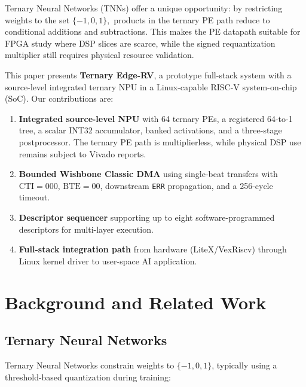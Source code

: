 \documentclass[10pt,conference]{IEEEtran}
\begin{document}
Ternary Neural Networks (TNNs) \cite{ternarynet} offer a unique opportunity: by restricting weights to the set $\{-1, 0, 1\},$ products in the ternary PE path reduce to conditional additions and subtractions. This makes the PE datapath suitable for FPGA study where DSP slices are scarce, while the signed requantization multiplier still requires physical resource validation.

This paper presents \textbf{Ternary Edge-RV}, a prototype full-stack system with a source-level integrated ternary NPU in a Linux-capable RISC-V system-on-chip (SoC). Our contributions are:

\begin{enumerate}
    \item \textbf{Integrated source-level NPU} with 64 ternary PEs, a registered 64-to-1 tree, a scalar INT32 accumulator, banked activations, and a three-stage postprocessor. The ternary PE path is multiplierless, while physical DSP use remains subject to Vivado reports.
    \item \textbf{Bounded Wishbone Classic DMA} using single-beat transfers with $\mathrm{CTI}=000$, $\mathrm{BTE}=00$, downstream \texttt{ERR} propagation, and a 256-cycle timeout.
    \item \textbf{Descriptor sequencer} supporting up to eight software-programmed descriptors for multi-layer execution.
    \item \textbf{Full-stack integration path} from hardware (LiteX/VexRiscv) through Linux kernel driver to user-space AI application.
\end{enumerate}

\section{Background and Related Work}
\label{sec:background}


\subsection{Ternary Neural Networks}
Ternary Neural Networks \cite{ternarynet, trainedternary} constrain weights to $\{-1, 0, 1\}$, typically using a threshold-based quantization during training:
\end{document}
